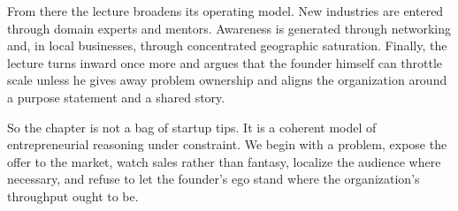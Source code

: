 From there the lecture broadens its operating model. New industries are entered through domain experts and mentors. Awareness is generated through networking and, in local businesses, through concentrated geographic saturation. Finally, the lecture turns inward once more and argues that the founder himself can throttle scale unless he gives away problem ownership and aligns the organization around a purpose statement and a shared story.

So the chapter is not a bag of startup tips. It is a coherent model of entrepreneurial reasoning under constraint. We begin with a problem, expose the offer to the market, watch sales rather than fantasy, localize the audience where necessary, and refuse to let the founder's ego stand where the organization's throughput ought to be.